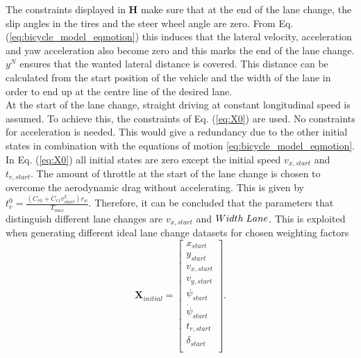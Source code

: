 The constraints displayed in $\bm{H}$ make sure that at the end of the lane change, the slip angles in the tires and the steer wheel angle are zero. From Eq. (\ref{eq:bicycle_model_eqmotion}) this induces that the lateral velocity, acceleration and yaw acceleration also become zero and this marks the end of the lane change. $y^N$ ensures that the wanted lateral distance is covered. This distance can be calculated from the start position of the vehicle and the width of the lane in order to end up at the centre line of the desired lane. \\ At the start of the lane change, straight driving at constant longitudinal speed is assumed. To achieve this, the constraints of Eq. (\ref{eq:X0}) are used. No constraints for acceleration is needed. This would give a redundancy due to the other initial states in combination with the equations of motion \ref{eq:bicycle_model_eqmotion}. In Eq. (\ref{eq:X0}) all initial states are zero except the initial speed $v_{x,start}$ and $t_{r,start}$. The amount of throttle at the start of the lane change is chosen to overcome the aerodynamic drag without accelerating. This is given by $t_r^0 = \frac{(C_{r0}+C_{r1}v_{start}^2)r_w}{T_{max}}$. Therefore, it can be concluded that the parameters that distinguish different lane changes are $v_{x,start}$ and $Width\hspace{1mm}Lane$. This is exploited when generating different ideal lane change datasets for chosen weighting factors
\newpage
\begin{equation}\label{eq:X0}
\bm{X}_{initial} =
\begin{bmatrix}
 x_{start}\\ 
 y_{start}\\
 v_{x,start}\\
 v_{y,start}\\
 \psi_{start}\\
 \dot{\psi}_{start}\\
 t_{r,start}\\
 \delta_{start}\\

\end{bmatrix}.
\end{equation}


